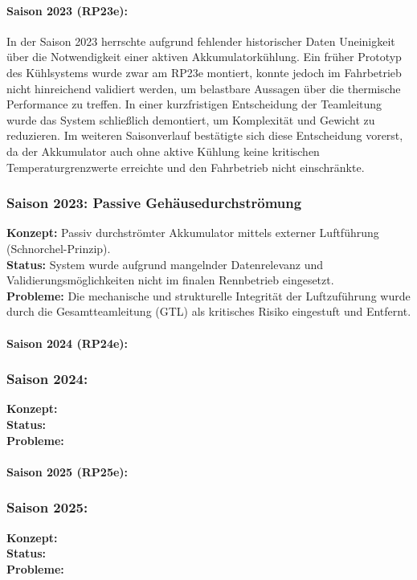 \paragraph{Saison 2023 (RP23e):} 
In der Saison 2023 herrschte aufgrund fehlender historischer Daten Uneinigkeit über die Notwendigkeit einer aktiven Akkumulatorkühlung. Ein früher Prototyp des Kühlsystems wurde zwar am RP23e montiert, konnte jedoch im Fahrbetrieb nicht hinreichend validiert werden, um belastbare Aussagen über die thermische Performance zu treffen. In einer kurzfristigen Entscheidung der Teamleitung wurde das System schließlich demontiert, um Komplexität und Gewicht zu reduzieren. Im weiteren Saisonverlauf bestätigte sich diese Entscheidung vorerst, da der Akkumulator auch ohne aktive Kühlung keine kritischen Temperaturgrenzwerte erreichte und den Fahrbetrieb nicht einschränkte.

\subsubsection{Saison 2023: Passive Gehäusedurchströmung}
\textbf{Konzept:} Passiv durchströmter Akkumulator mittels externer Luftführung (Schnorchel-Prinzip). \\
\textbf{Status:} System wurde aufgrund mangelnder Datenrelevanz und Validierungsmöglichkeiten nicht im finalen Rennbetrieb eingesetzt. \\
\textbf{Probleme:} Die mechanische und strukturelle Integrität der Luftzuführung wurde durch die Gesamtteamleitung (GTL) als kritisches Risiko eingestuft und Entfernt.


\paragraph{Saison 2024 (RP24e):} 

\subsubsection{Saison 2024: }
\textbf{Konzept:}  \\
\textbf{Status:}  \\
\textbf{Probleme:} 

\paragraph{Saison 2025 (RP25e):} 

\subsubsection{Saison 2025: }
\textbf{Konzept:}  \\
\textbf{Status:}  \\
\textbf{Probleme:} 



